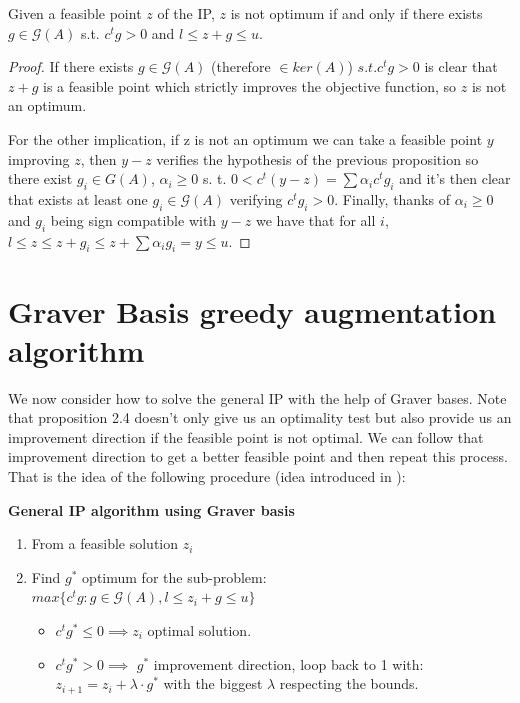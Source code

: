 \begin{proposition}
Given a feasible point $z$ of the IP, $z$ is not optimum if and only if there exists $g \in \mathcal{G}(A)$ s.t. $c^tg > 0$ and $l \leq z + g \leq u$.
\end{proposition}
\vspace{-20pt}
\begin{proof}
If there exists $g \in \mathcal{G}(A)$ (therefore $\in ker(A)$) $s.t. c^tg > 0$ is clear that $z + g$ is a feasible point which strictly improves the objective function, so $z$ is not an optimum. 

For the other implication, if z is not an optimum we can take a feasible point $y$ improving $z$, then $y - z$ verifies the hypothesis of the previous proposition so there exist $g_i \in G(A)$, $\alpha_i \geq 0$ s. t. $0 < c^t(y - z) = \sum \alpha_i c^t g_i$ and it's then clear that exists at least one $g_i \in \mathcal{G}(A)$ verifying $c^tg_i > 0$. Finally, thanks of $\alpha_i \geq 0$ and $g_i$ being sign compatible with $y - z$ we have that for all $i$, $l \leq z \leq z + g_i \leq z + \sum \alpha_i g_i = y \leq u$.
\end{proof}

\section{Graver Basis greedy augmentation algorithm}

We now consider how to solve the general IP with the help of Graver bases. Note that proposition 2.4 doesn't only give us an optimality test but also provide us an improvement direction if the feasible point is not optimal. We can follow that improvement direction to get a better feasible point and then repeat this process. That is the idea of the following procedure (idea introduced in \cite{GRAVER:1975}):

\textbf{General IP algorithm using Graver basis}
\vspace{-8pt}
\begin{enumerate}
    \item From a feasible solution $z_i$
    \item Find $g^*$ optimum for the sub-problem: \vspace{4pt}\\
          $max\{c^tg : g \in \mathcal{G}(A), l \leq z_i + g \leq u \}$ \vspace{4pt}
    \begin{itemize}
        \item $c^tg^* \leq 0 \implies z_i$ optimal solution.
        \item $c^tg^* > 0 \implies$ $g^*$ improvement direction, loop back to 1 with:\\ $z_{i+1} = z_i + \lambda \cdot g^*$ with the biggest $\lambda$ respecting the bounds.
    \end{itemize}
\end{enumerate}

